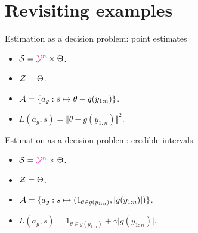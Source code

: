\documentclass[10pt]{beamer}
\begin{document}
\section{Revisiting examples}

\begin{frame}{Estimation as a decision problem: point estimates}
  \begin{itemize}
    \item $\mathcal{S} = \textcolor{magenta}{\mathcal{Y}^n}\times \Theta$.
    \item $\mathcal{Z} = \Theta$.
    \item $\mathcal{A} = \{a_g: s\mapsto \theta - g(y_{1:n})\}$.
    \item $L(a_g,s) = \Vert \theta - g(y_{1:n}) \Vert^2$.
    \end{itemize}
    \blank
    \vfill
\end{frame}

\begin{frame}{Estimation as a decision problem: credible intervals}
  \begin{itemize}
    \item $\mathcal{S} = \textcolor{magenta}{\mathcal{Y}^n}\times \Theta$.
    \item $\mathcal{Z} = \Theta$.
    \item $\mathcal{A} = \{a_g: s\mapsto (1_{\theta \in g(y_{1:n})}, \vert g(y_{1:n})\vert) \}$.
    \item $L(a_g,s) = 1_{\theta \in g(y_{1:n})} + \gamma \vert g(y_{1:n})\vert$.
    \end{itemize}
    \blank
    \vfill
\end{frame}


\end{document}
